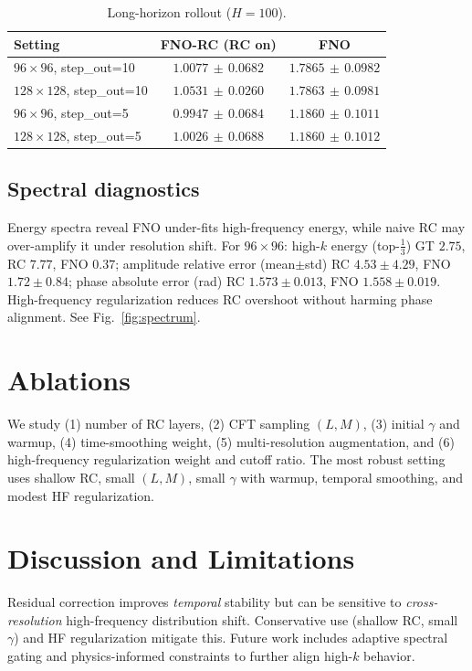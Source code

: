 \documentclass[11pt]{article}
\begin{document}
\begin{table}[h]
  \centering
  \small
  \caption{Long-horizon rollout ($H=100$).}
  \begin{tabular}{lcc}
    \toprule
    Setting & FNO-RC (RC on) & FNO \\
    \midrule
    $96\times96$, step\_out=10 & $1.0077\,\pm\,0.0682$ & $1.7865\,\pm\,0.0982$ \\
    $128\times128$, step\_out=10 & $1.0531\,\pm\,0.0260$ & $1.7863\,\pm\,0.0981$ \\
    $96\times96$, step\_out=5  & $\mathbf{0.9947}\,\pm\,0.0684$ & $1.1860\,\pm\,0.1011$ \\
    $128\times128$, step\_out=5 & $1.0026\,\pm\,0.0688$ & $1.1860\,\pm\,0.1012$ \\
    \bottomrule
  \end{tabular}
  \label{tab:rollout}
\end{table}

\subsection{Spectral diagnostics}
Energy spectra reveal FNO under-fits high-frequency energy, while naive RC may over-amplify it under resolution shift. For $96\times96$: high-$k$ energy (top-$\frac{1}{3}$) GT $2.75$, RC $7.77$, FNO $0.37$; amplitude relative error (mean$\pm$std) RC $4.53\pm4.29$, FNO $1.72\pm0.84$; phase absolute error (rad) RC $1.573\pm0.013$, FNO $1.558\pm0.019$. High-frequency regularization reduces RC overshoot without harming phase alignment. See Fig.~\ref{fig:spectrum}.

\section{Ablations}
We study (1) number of RC layers, (2) CFT sampling $(L,M)$, (3) initial $\gamma$ and warmup, (4) time-smoothing weight, (5) multi-resolution augmentation, and (6) high-frequency regularization weight and cutoff ratio. The most robust setting uses shallow RC, small $(L,M)$, small $\gamma$ with warmup, temporal smoothing, and modest HF regularization.

\section{Discussion and Limitations}
Residual correction improves \emph{temporal} stability but can be sensitive to \emph{cross-resolution} high-frequency distribution shift. Conservative use (shallow RC, small $\gamma$) and HF regularization mitigate this. Future work includes adaptive spectral gating and physics-informed constraints to further align high-$k$ behavior.
\end{document}

